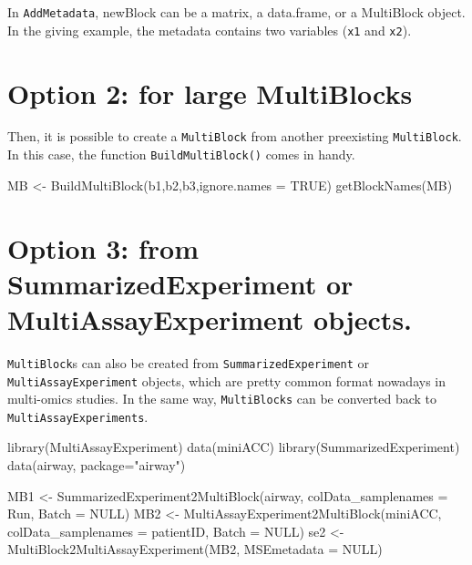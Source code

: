 \documentclass[
]{book}
\newenvironment{Shaded}{\begin{snugshade}}{\end{snugshade}}
\newcommand{\AttributeTok}[1]{\textcolor[rgb]{0.77,0.63,0.00}{#1}}
\newcommand{\ConstantTok}[1]{\textcolor[rgb]{0.00,0.00,0.00}{#1}}
\newcommand{\FunctionTok}[1]{\textcolor[rgb]{0.00,0.00,0.00}{#1}}
\newcommand{\NormalTok}[1]{#1}
\newcommand{\OtherTok}[1]{\textcolor[rgb]{0.56,0.35,0.01}{#1}}
\newcommand{\StringTok}[1]{\textcolor[rgb]{0.31,0.60,0.02}{#1}}
\begin{document}
In \texttt{AddMetadata}, newBlock can be a matrix, a data.frame, or a MultiBlock
object. In the giving example, the metadata contains two variables (\texttt{x1} and
\texttt{x2}).

\hypertarget{option2}{%
\section{Option 2: for large MultiBlocks}\label{option2}}

Then, it is possible to create a \texttt{MultiBlock} from another preexisting
\texttt{MultiBlock}. In this case, the function \texttt{BuildMultiBlock()} comes in handy.

\begin{Shaded}
\begin{Highlighting}[]
\NormalTok{MB }\OtherTok{\textless{}{-}} \FunctionTok{BuildMultiBlock}\NormalTok{(b1,b2,b3,}\AttributeTok{ignore.names =} \ConstantTok{TRUE}\NormalTok{)}
\FunctionTok{getBlockNames}\NormalTok{(MB)}
\end{Highlighting}
\end{Shaded}

\hypertarget{option3}{%
\section{Option 3: from SummarizedExperiment or MultiAssayExperiment objects.}\label{option3}}

\texttt{MultiBlock}s can also be created from \texttt{SummarizedExperiment} or
\texttt{MultiAssayExperiment} objects, which are pretty common format nowadays in
multi-omics studies. In the same way, \texttt{MultiBlocks} can be converted back to
\texttt{MultiAssayExperiments}.

\begin{Shaded}
\begin{Highlighting}[]
\FunctionTok{library}\NormalTok{(MultiAssayExperiment)}
\FunctionTok{data}\NormalTok{(miniACC)}
\FunctionTok{library}\NormalTok{(SummarizedExperiment)}
\FunctionTok{data}\NormalTok{(airway, }\AttributeTok{package=}\StringTok{"airway"}\NormalTok{)}

\NormalTok{MB1 }\OtherTok{\textless{}{-}} \FunctionTok{SummarizedExperiment2MultiBlock}\NormalTok{(airway,}
                                       \AttributeTok{colData\_samplenames =} \StringTok{\textquotesingle{}Run\textquotesingle{}}\NormalTok{,}
                                       \AttributeTok{Batch =} \ConstantTok{NULL}\NormalTok{)}
\NormalTok{MB2 }\OtherTok{\textless{}{-}} \FunctionTok{MultiAssayExperiment2MultiBlock}\NormalTok{(miniACC,}
                                       \AttributeTok{colData\_samplenames =} \StringTok{\textquotesingle{}patientID\textquotesingle{}}\NormalTok{,}
                                       \AttributeTok{Batch =} \ConstantTok{NULL}\NormalTok{)}
\NormalTok{se2 }\OtherTok{\textless{}{-}}  \FunctionTok{MultiBlock2MultiAssayExperiment}\NormalTok{(MB2, }\AttributeTok{MSEmetadata =} \ConstantTok{NULL}\NormalTok{)}
\end{Highlighting}
\end{Shaded}
\end{document}
